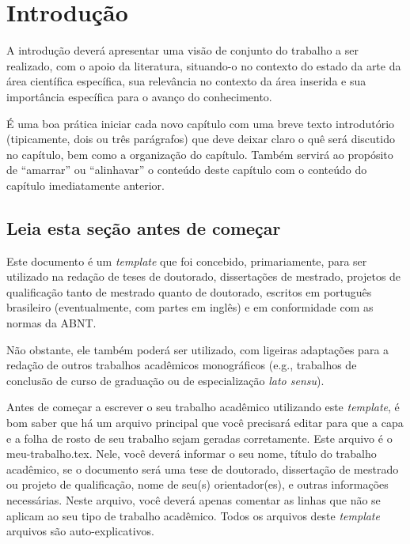 
\chapter{Introdução}
\label{chap_introducao}

A introdução deverá apresentar uma visão de conjunto do trabalho a ser realizado, com o apoio da literatura, situando-o no contexto do estado da arte da área científica específica, sua relevância no contexto da área inserida e sua importância específica para o avanço do conhecimento.

É uma boa prática iniciar cada novo capítulo com uma breve texto introdutório (tipicamente, dois ou três parágrafos) que deve deixar claro o quê será discutido no capítulo, bem como a organização do capítulo.
Também servirá ao propósito de ``amarrar'' ou ``alinhavar'' o conteúdo deste capítulo com o conteúdo do capítulo imediatamente anterior.

\section{Leia esta seção antes de começar}
\label{sec_leia_esta_secao_antes_de_omecar}

Este documento é um \emph{template} que foi concebido, primariamente, para ser utilizado na redação de teses de doutorado, dissertações de mestrado, projetos de qualificação tanto de mestrado quanto de doutorado, escritos em português brasileiro (eventualmente, com partes em inglês) e em conformidade com as normas da ABNT.

Não obstante, ele também poderá ser utilizado, com ligeiras adaptações para a redação de outros trabalhos acadêmicos monográficos (e.g., trabalhos de conclusão de curso de graduação ou de especialização \emph{lato sensu}).

Antes de começar a escrever o seu trabalho acadêmico utilizando este \emph{template}, é bom saber que há um arquivo principal que você precisará editar para que a capa e a folha de rosto de seu trabalho sejam geradas corretamente.
Este arquivo é o {\ttfamily meu-\allowbreak trabalho.tex}.
Nele, você deverá informar o seu nome, título do trabalho acadêmico, se o documento será uma tese de doutorado, dissertação de mestrado ou projeto de qualificação, nome de seu(s) orientador(es), e outras informações necessárias.
Neste arquivo, você deverá apenas comentar as linhas que não se aplicam ao seu tipo de trabalho acadêmico.
Todos os arquivos deste \emph{template} arquivos são auto-explicativos.

